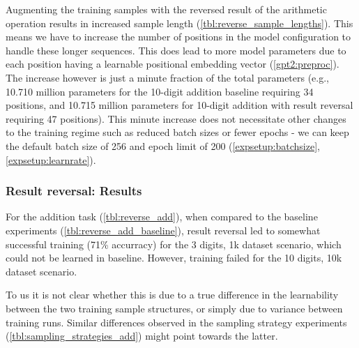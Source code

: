 Augmenting the training samples with the reversed result of the arithmetic operation results in increased sample length (\cref{tbl:reverse_sample_lengths}).
This means we have to increase the number of positions in the model configuration to handle these longer sequences. This does lead to more model parameters due to each position having a learnable positional embedding vector (\cref{gpt2:preproc}). The increase however is just a minute fraction of the total parameters (e.g., 10.710 million parameters for the 10-digit addition baseline requiring 34 positions, and 10.715 million parameters for 10-digit addition with result reversal requiring 47 positions). This minute increase does not necessitate other changes to the training regime such as reduced batch sizes or fewer epochs - we can keep the default batch size of 256 and epoch limit of 200 (\cref{expsetup:batchsize}, \cref{expsetup:learnrate}).

\subsubsection{Result reversal: Results}

\begin{table}[H]
	\begin{minipage}[t]{0.47\linewidth}
		\hfill
		\label{tbl:reverse_add}
	\end{minipage}
	\hfill %
	\begin{minipage}[t]{0.47\linewidth}
		\hfill
		\label{tbl:reverse_add_baseline}
	\end{minipage}
\end{table}

For the addition task (\cref{tbl:reverse_add}), when compared to the baseline experiments (\cref{tbl:reverse_add_baseline}), result reversal led to somewhat successful training (71\% accurracy) for the 3 digits, 1k dataset scenario, which could not be learned in baseline. However, training failed for the 10 digits, 10k dataset scenario.

To us it is not clear whether this is due to a true difference in the learnability between the two training sample structures, or simply due to variance between training runs. Similar differences observed in the sampling strategy experiments (\cref{tbl:sampling_strategies_add}) might point towards the latter.

